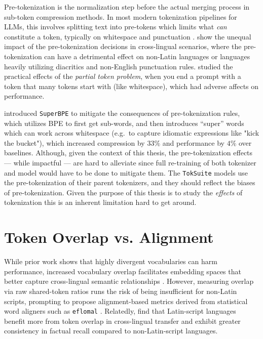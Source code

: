 \documentclass[a4paper]{article}
\begin{document}
Pre-tokenization is the normalization step before the actual merging process in sub-token compression methods. In most modern tokenization pipelines for LLMs, this involves splitting text into pre-tokens which limits what \textit{can} constitute a token, typically on whitespace and punctuation \parencite{schmidt2025}. \textcite{arnett2025, wegmann2025} show the unequal impact of the pre-tokenization decisions in cross-lingual scenarios, where the pre-tokenization can have a detrimental effect on non-Latin languages or languages heavily utilizing diacritics and non-English punctuation rules. \textcite{xu2026} studied the practical effects of the \textit{partial token problem}, when you end a prompt with a token that many tokens start with (like whitespace), which had adverse affects on performance.

\textcite{liu2025b} introduced \texttt{SuperBPE} to mitigate the consequences of pre-tokenization rules, which utilizes BPE to first get sub-words, and then introduces ``super'' words which can work across whitespace (e.g.\ to capture idiomatic expressions like "kick the bucket"), which increased compression by $33\%$ and performance by $4\%$ over baselines. Although, given the context of this thesis, the pre-tokenization effects --- while impactful --- are hard to alleviate since full re-training of both tokenizer and model would have to be done to mitigate them. The \texttt{TokSuite} models use the pre-tokenization of their parent tokenizers, and they should reflect the biases of pre-tokenization. Given the purpose of this thesis is to study the \textit{effects} of tokenization this is an inherent limitation hard to get around.

\section{Token Overlap vs. Alignment}\label{sec:overlap}

While prior work shows that highly divergent vocabularies can harm performance, increased vocabulary overlap facilitates embedding spaces that better capture cross-lingual semantic relationships \parencite{kallini2025, limisiewicz2023}. However, measuring overlap via raw shared-token ratios runs the risk of being insufficient for non-Latin scripts, prompting \textcite{hammerl2025} to propose alignment-based metrics derived from statistical word aligners such as \texttt{eflomal} \parencite{ostling2016}. Relatedly, \textcite{liu2025c} find that Latin-script languages benefit more from token overlap in cross-lingual transfer and exhibit greater consistency in factual recall compared to non-Latin-script languages.
\end{document}

